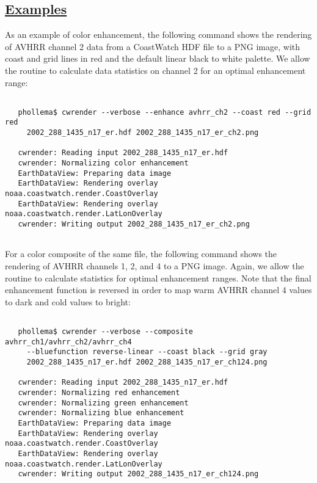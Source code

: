 \subsection*{\underline{Examples}}


 As an example of color enhancement, the following command shows the rendering of AVHRR channel 2 data from a CoastWatch HDF file to a PNG image, with coast and grid lines in red and the default linear black to white palette. We allow the routine to calculate data statistics on channel 2 for an optimal enhancement range:
\begin{verbatim}

   phollema$ cwrender --verbose --enhance avhrr_ch2 --coast red --grid red 
     2002_288_1435_n17_er.hdf 2002_288_1435_n17_er_ch2.png

   cwrender: Reading input 2002_288_1435_n17_er.hdf
   cwrender: Normalizing color enhancement
   EarthDataView: Preparing data image
   EarthDataView: Rendering overlay noaa.coastwatch.render.CoastOverlay
   EarthDataView: Rendering overlay noaa.coastwatch.render.LatLonOverlay
   cwrender: Writing output 2002_288_1435_n17_er_ch2.png
 
\end{verbatim}


 For a color composite of the same file, the following command shows the rendering of AVHRR channels 1, 2, and 4 to a PNG image. Again, we allow the routine to calculate statistics for optimal enhancement ranges. Note that the final enhancement function is reversed in order to map warm AVHRR channel 4 values to dark and cold values to bright:
\begin{verbatim}

   phollema$ cwrender --verbose --composite avhrr_ch1/avhrr_ch2/avhrr_ch4
     --bluefunction reverse-linear --coast black --grid gray 
     2002_288_1435_n17_er.hdf 2002_288_1435_n17_er_ch124.png

   cwrender: Reading input 2002_288_1435_n17_er.hdf
   cwrender: Normalizing red enhancement
   cwrender: Normalizing green enhancement
   cwrender: Normalizing blue enhancement
   EarthDataView: Preparing data image
   EarthDataView: Rendering overlay noaa.coastwatch.render.CoastOverlay
   EarthDataView: Rendering overlay noaa.coastwatch.render.LatLonOverlay
   cwrender: Writing output 2002_288_1435_n17_er_ch124.png
 
\end{verbatim}


